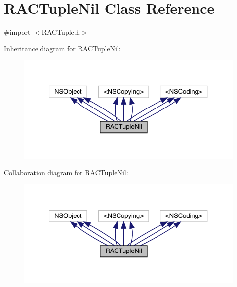 \hypertarget{interface_r_a_c_tuple_nil}{}\section{R\+A\+C\+Tuple\+Nil Class Reference}
\label{interface_r_a_c_tuple_nil}


{\ttfamily \#import $<$R\+A\+C\+Tuple.\+h$>$}



Inheritance diagram for R\+A\+C\+Tuple\+Nil\+:\nopagebreak
\begin{figure}[H]
\begin{center}
\leavevmode
\includegraphics[width=327pt]{interface_r_a_c_tuple_nil__inherit__graph}
\end{center}
\end{figure}


Collaboration diagram for R\+A\+C\+Tuple\+Nil\+:\nopagebreak
\begin{figure}[H]
\begin{center}
\leavevmode
\includegraphics[width=327pt]{interface_r_a_c_tuple_nil__coll__graph}
\end{center}
\end{figure}

